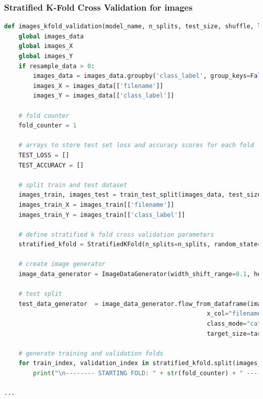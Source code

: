 \documentclass[11pt,a4paper]{article}
\begin{document}
\subsubsection{Stratified K-Fold Cross Validation for images}
\begin{lstlisting}[language=Python,frame=single,caption={Definition of the function used to perform stratified K-Fold cross validation with images data.},captionpos=b]
def images_kfold_validation(model_name, n_splits, test_size, shuffle, layers, learning_rate, decay, target_size, epochs, batch_size, one_fold=True, resample_data=0):
    global images_data
    global images_X
    global images_Y
    if resample_data > 0:
        images_data = images_data.groupby('class_label', group_keys=False).apply(lambda x: x.sample(min(len(x), resample_data), random_state=42))
        images_X = images_data[['filename']]
        images_Y = images_data[['class_label']]

    # fold counter
    fold_counter = 1

    # arrays to store test set loss and accuracy scores for each fold
    TEST_LOSS = []
    TEST_ACCURACY = []

    # split train and test dataset
    images_train, images_test = train_test_split(images_data, test_size=test_size, stratify=images_Y, random_state=42)
    images_train_X = images_train[['filename']]
    images_train_Y = images_train[['class_label']]

    # define stratified k fold cross validation parameters
    stratified_kfold = StratifiedKFold(n_splits=n_splits, random_state=7, shuffle=shuffle)

    # create image generator
    image_data_generator = ImageDataGenerator(width_shift_range=0.1, height_shift_range=0.1, zoom_range=0.3, fill_mode='nearest', horizontal_flip=True, rescale=1./255)

    # test split
    test_data_generator  = image_data_generator.flow_from_dataframe(images_test, directory=None,
                                                        x_col="filename", y_col="class_label",
                                                        class_mode="categorical", shuffle=shuffle,
                                                        target_size=target_size, batch_size=batch_size)

    # generate training and validation folds
    for train_index, validation_index in stratified_kfold.split(images_train_X, images_train_Y):
        print("\n-------- STARTING FOLD: " + str(fold_counter) + " --------")

...
\end{lstlisting}
\end{document}
